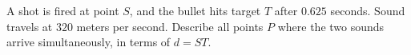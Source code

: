 A shot is fired at point $S$, and the bullet hits target $T$ after $0.625$ seconds. Sound travels at $320$ meters per second. Describe all points $P$ where the two sounds arrive simultaneously, in terms of $d=ST$.
